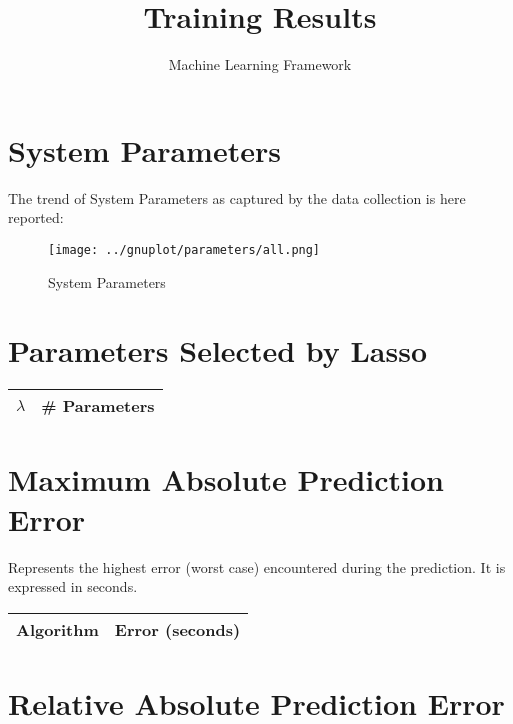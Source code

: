\documentclass[10pt,a4paper]{article}
\title{Training Results}
\author{Machine Learning Framework}
\begin{document}
\maketitle

\section{System Parameters}

The trend of System Parameters as captured by the data collection is here reported:

\begin{figure}[!ht]
\texttt{[image: ../gnuplot/parameters/all.png]}
\caption{System Parameters}
\label{sys-parms}
\end{figure}



\section{Parameters Selected by Lasso}

\begin{center}
\begin{tabular}{cc}
\toprule
$\lambda$ & \# Parameters \\
\midrule

\bottomrule
\end{tabular}
\end{center}






\section{Maximum Absolute Prediction Error}

Represents the highest error (worst case) encountered during the prediction. It is expressed in seconds.

\begin{center}
\begin{tabular}{cc}
\toprule
\textbf{Algorithm} & \textbf{Error (seconds)} \\
\midrule

\bottomrule
\end{tabular}
\end{center}






\section{Relative Absolute Prediction Error}
\end{document}
